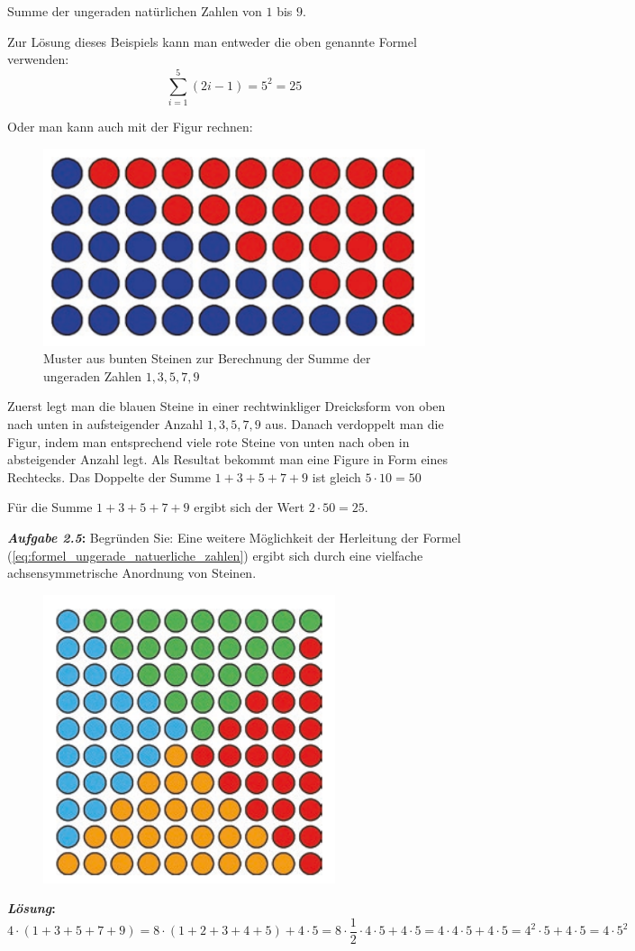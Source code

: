 \begin{example}Summe der ungeraden natürlichen Zahlen von $1$ bis $9$.
 
 Zur Lösung dieses Beispiels kann man entweder die oben genannte
 Formel verwenden:
 \[
  \sum_{i=1}^{5} (2i -1) = 5^2 = 25
 \]

 Oder man kann auch mit der Figur rechnen:
 
 \begin{figure}[H]
  \centering
  \includegraphics[width=.5\linewidth]{./images/muster03.png}
  \caption[]{Muster aus bunten Steinen zur Berechnung der Summe der ungeraden Zahlen $1,3,5,7,9$}
  \label{fig:muster_ungerade_1_bis_9}
\end{figure}

Zuerst legt man die blauen Steine in einer rechtwinkliger Dreicksform
von oben nach unten in aufsteigender Anzahl $1, 3, 5, 7, 9$ aus.
Danach verdoppelt man die Figur, indem man entsprechend viele rote Steine
von unten nach oben in absteigender Anzahl legt.
Als Resultat bekommt man eine Figure in Form eines Rechtecks.
Das Doppelte der Summe $1 + 3 + 5 + 7 + 9$ ist gleich $5\cdot 10 = 50$

Für die Summe $1 + 3 + 5 + 7 + 9$ ergibt sich der Wert $2\cdot 50 = 25$.
\end{example}
\vspace{.2cm}

\textbf{\textit{Aufgabe 2.5}:}
Begründen Sie: Eine weitere Möglichkeit der Herleitung der Formel
(\ref{eq:formel_ungerade_natuerliche_zahlen})
ergibt sich durch eine vielfache achsensymmetrische Anordnung von Steinen.

\begin{figure}[H]
  \centering
  \includegraphics[width=.5\linewidth]{./images/muster04.png}
  \caption[]{}
  \label{fig:muster_ungerade_1_bis_9_achsensymmetrisch}
\end{figure}

\textbf{\textit{Lösung}:}
\[
  4 \cdot (1+3+5+7+9) = 8 \cdot (1+2+3+4+5) + 4\cdot 5
  = 8 \cdot \frac{1}{2}\cdot 4 \cdot 5 + 4 \cdot 5
  = 4 \cdot 4 \cdot 5 + 4 \cdot 5
  = 4^2 \cdot 5 + 4 \cdot 5
  = 4 \cdot 5^2
\]


